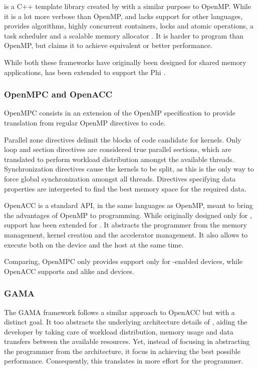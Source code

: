 \tbb is a C++ template library created by \intel with a similar purpose to OpenMP. While it is a lot more verbose than OpenMP, and lacks support for other languages, \tbb provides algorithms, highly concurrent containers, locks and atomic operations, a task scheduler and a scalable memory allocator \cite{TBB}. It is harder to program than OpenMP, but \intel claims it to achieve equivalent or better performance.

While both these frameworks have originally been designed for shared memory applications, \tbb has been extended to support the \xeon Phi \cite{Intel:XeonPhi:DevGuide}.

\subsubsection{OpenMPC and OpenACC}
OpenMPC\cite{OpenMPC} consists in an extension of the OpenMP specification to provide translation from  regular OpenMP directives to \cuda code.

Parallel zone directives delimit the blocks of code candidate for \cuda kernels. Only loop and section directives are considered true parallel sections, which are translated to perform workload distribution amongst the available threads. Synchronization directives cause the kernels to be split, as this is the only way to force global synchronization amongst all threads. Directives specifying data properties are interpreted to find the best \gpu memory space for the required data.

OpenACC\cite{OpenACC:1.0} is a standard API, in the same languages as OpenMP, meant to bring the advantages of OpenMP to \gpu programming. While originally designed only for \gpus, support has been extended for \mics. It abstracts the programmer from the memory management, kernel creation and the accelerator management. It also allows to execute both on the device and the \gpu host at the same time.


Comparing, OpenMPC only provides support only for \cuda-enabled devices, while OpenACC supports \nvidia and \amd\gpus alike and \intel\mic devices.

\subsubsection{GAMA}
The \ac{GAMA} framework follows a similar approach to OpenACC but with a distinct goal. It too abstracts the underlying architecture details of \hetplats, aiding the developer by taking care of workload distribution, memory usage and data transfers between the available resources. Yet, instead of focusing in abstracting the programmer from the architecture, it focus in achieving the best possible performance. Consequently, this translates in more effort for the programmer.
